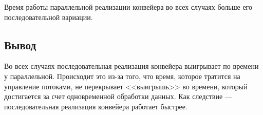 Время работы параллельной реализации конвейера во всех случаях больше его последовательной вариации.

\subsection*{Вывод}
Во всех случаях последовательная реализация конвейера выигрывает по времени у параллельной.
Происходит это из-за того, что время, которое тратится на управление потоками, не перекрывает <<выигрышь>> во времени, который достигается за счет одновременной обработки данных.
Как следствие --- последовательная реализация конвейера работает быстрее.
